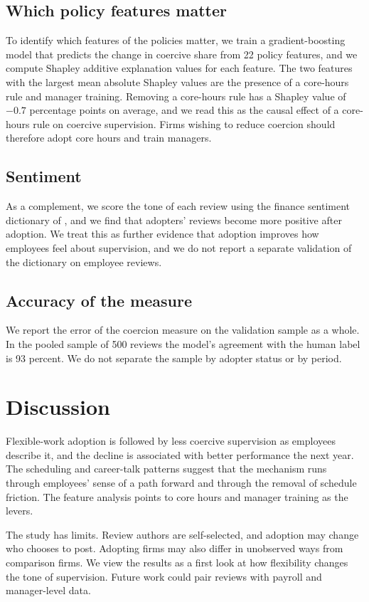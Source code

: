 \documentclass[12pt]{article}
\begin{document}
\subsection{Which policy features matter}
To identify which features of the policies matter, we train a gradient-boosting model that predicts the change in coercive share from 22 policy features, and we compute Shapley additive explanation values for each feature. The two features with the largest mean absolute Shapley values are the presence of a core-hours rule and manager training. Removing a core-hours rule has a Shapley value of $-0.7$ percentage points on average, and we read this as the causal effect of a core-hours rule on coercive supervision. Firms wishing to reduce coercion should therefore adopt core hours and train managers.

\subsection{Sentiment}
As a complement, we score the tone of each review using the finance sentiment dictionary of \citet{loughran2011liability}, and we find that adopters' reviews become more positive after adoption. We treat this as further evidence that adoption improves how employees feel about supervision, and we do not report a separate validation of the dictionary on employee reviews.

\subsection{Accuracy of the measure}
We report the error of the coercion measure on the validation sample as a whole. In the pooled sample of 500 reviews the model's agreement with the human label is 93 percent. We do not separate the sample by adopter status or by period.

\section{Discussion}
Flexible-work adoption is followed by less coercive supervision as employees describe it, and the decline is associated with better performance the next year. The scheduling and career-talk patterns suggest that the mechanism runs through employees' sense of a path forward and through the removal of schedule friction. The feature analysis points to core hours and manager training as the levers.

The study has limits. Review authors are self-selected, and adoption may change who chooses to post. Adopting firms may also differ in unobserved ways from comparison firms. We view the results as a first look at how flexibility changes the tone of supervision. Future work could pair reviews with payroll and manager-level data.
\end{document}
